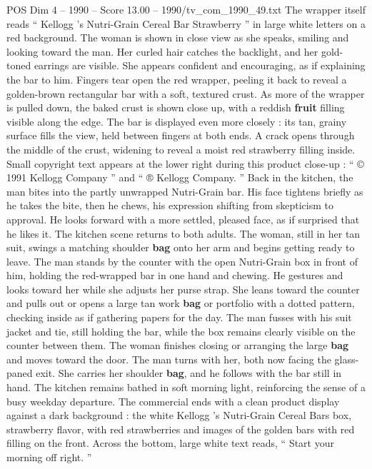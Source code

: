 \begin{textsample}{POS Dim 4 – 1990 – Score 13.00 – 1990/tv\_com\_1990\_49.txt}
The wrapper itself reads “ Kellogg ’s Nutri-Grain Cereal Bar Strawberry ” in large white letters on a red background.
The woman is shown in close view as she speaks, smiling and looking toward the man.
Her curled hair catches the backlight, and her gold-toned earrings are visible.
She appears confident and encouraging, as if explaining the bar to him.
Fingers tear open the red wrapper, peeling it back to reveal a golden-brown rectangular bar with a soft, textured crust.
As more of the wrapper is pulled down, the baked crust is shown close up, with a reddish \textbf{fruit} filling visible along the edge.
The bar is displayed even more closely : its tan, grainy surface fills the view, held between fingers at both ends.
A crack opens through the middle of the crust, widening to reveal a moist red strawberry filling inside.
Small copyright text appears at the lower right during this product close-up : “ {\EmojiFont ©} 1991 Kellogg Company ” and “ {\EmojiFont ®} Kellogg Company. ” Back in the kitchen, the man bites into the partly unwrapped Nutri-Grain bar.
His face tightens briefly as he takes the bite, then he chews, his expression shifting from skepticism to approval.
He looks forward with a more settled, pleased face, as if surprised that he likes it.
The kitchen scene returns to both adults.
The woman, still in her tan suit, swings a matching shoulder \textbf{bag} onto her arm and begins getting ready to leave.
The man stands by the counter with the open Nutri-Grain box in front of him, holding the red-wrapped bar in one hand and chewing.
He gestures and looks toward her while she adjusts her purse strap.
She leans toward the counter and pulls out or opens a large tan work \textbf{bag} or portfolio with a dotted pattern, checking inside as if gathering papers for the day.
The man fusses with his suit jacket and tie, still holding the bar, while the box remains clearly visible on the counter between them.
The woman finishes closing or arranging the large \textbf{bag} and moves toward the door.
The man turns with her, both now facing the glass-paned exit.
She carries her shoulder \textbf{bag}, and he follows with the bar still in hand.
The kitchen remains bathed in soft morning light, reinforcing the sense of a busy weekday departure.
The commercial ends with a clean product display against a dark background : the white Kellogg ’s Nutri-Grain Cereal Bars box, strawberry flavor, with red strawberries and images of the golden bars with red filling on the front.
Across the bottom, large white text reads, “ Start your morning off right. ”

\end{textsample}
